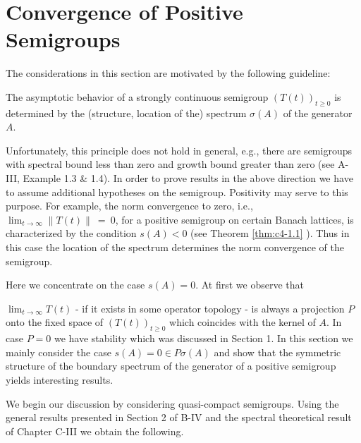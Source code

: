 \section{Convergence of Positive Semigroups}\label{sec:c4-2}
%
The considerations in this section are motivated by the following guideline:

\begin{flushleft} 
\addtolength{\leftskip}{1cm}
\addtolength{\rightskip}{1cm}
The asymptotic behavior of a strongly continuous semigroup $(T(t))_{t \geq 0}$ is determined by the (structure, location of the) spectrum $\sigma(A)$ of the generator $A$.
\end{flushleft}

Unfortunately, this principle does not hold in general, e.g., there are semigroups with spectral bound less than zero and growth bound greater than zero (see A-III, Example 1.3 \& 1.4).
In order to prove results in the above direction we have to assume additional hypotheses on the semigroup.
Positivity may serve to this purpose.
For example, the norm convergence to zero, i.e., $\lim_{t \to \infty} \|T(t)\|~=~0$, for a positive semigroup on certain Banach lattices, is characterized by the condition $s(A) < 0$ (see Theorem \ref{thm:c4-1.1} ).
Thus in this case the location of the spectrum determines the norm convergence of the semigroup.

Here we concentrate on the case $s(A) = 0$.
At first we observe that


$\lim_{t \to \infty} T(t)$ - if it exists in some operator topology - is always a projection $P$ onto the fixed space of $(T(t))_{t \geq 0}$ which coincides with the kernel of $A$.
In case $P = 0$ we have stability which was discussed in Section 1.
In this section we mainly consider the case $s(A) = 0 \in P{\sigma}(A)$ and show that the symmetric structure of the boundary spectrum of the generator of a positive semigroup yields interesting results.

We begin our discussion by considering quasi-compact semigroups.
Using the general results presented in Section 2 of B-IV and the spectral theoretical result of Chapter C-III we obtain the following.

